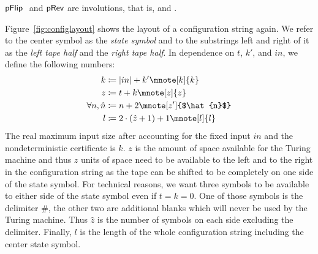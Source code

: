 \begin{fact}[Involutions]\label{fact:prev_involution}
  $\textsf{pFlip}~$ and $\textsf{pRev}{}$ are involutions, that is,  and .
\end{fact}

Figure~\ref{fig:configlayout} shows the layout of a configuration string again. We refer to the center symbol as the \emph{state symbol} and to the substrings left and right of it as the \emph{left tape half} and the \emph{right tape half}.
In dependence on $t$, $k'$, and $in$, we define the following numbers:
\begin{align*}
  k &\defeq \length{in} + k' \mnote[k]{k}\\
  z &\defeq t + k \mnote[z]{z}\\
  \forall n, \hat{n} &\defeq n + 2 \mnote[z']{$\hat{n}$}\\
  l &\defeq 2 \cdot (\hat{z} + 1) + 1 \mnote[l]{l}
\end{align*}
The real maximum input size after accounting for the fixed input $in$ and the nondeterministic certificate is $k$.
$z$ is the amount of space available for the Turing machine and thus $z$ units of space need to be available to the left and to the right in the configuration string as the tape can be shifted to be completely on one side of the state symbol.
For technical reasons, we want three symbols to be available to either side of the state symbol even if $t = k = 0$. One of those symbols is the delimiter $\#$, the other two are additional blanks which will never be used by the Turing machine. Thus $\hat{z}$ is the number of symbols on each side excluding the delimiter. 
Finally, $l$ is the length of the whole configuration string including the center state symbol.

